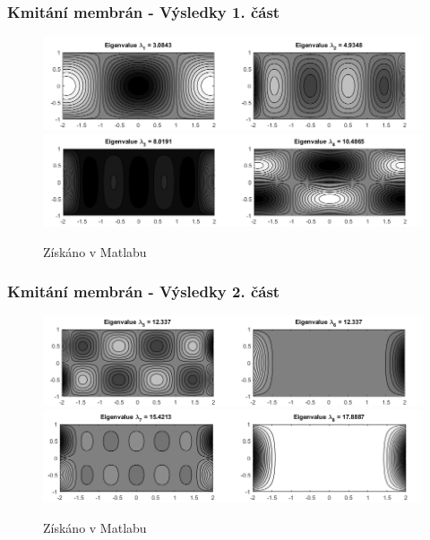 \documentclass[xcolor=table]{beamer}
\begin{document}
\begin{frame}
\frametitle{Kmitání membrán - Výsledky 1. část}
\centering
\begin{figure}
\includegraphics[width=1\linewidth]{obdelnicky1.png}
\includegraphics[width=1\linewidth]{obdelnicky2.png}
\caption{Získáno v Matlabu}
\end{figure}
\end{frame}

\begin{frame}
\frametitle{Kmitání membrán - Výsledky 2. část}
\centering
\begin{figure}
\includegraphics[width=1\linewidth]{obdelnicky3.png}
\includegraphics[width=1\linewidth]{obdelnicky4.png}
\caption{Získáno v Matlabu}
\end{figure}
\end{frame}
\end{document}
